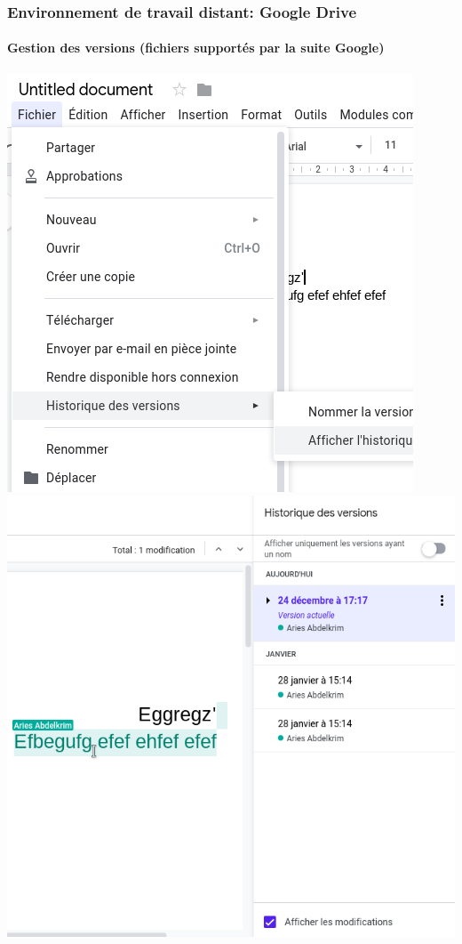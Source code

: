 \documentclass[xcolor=table]{beamer}
\begin{document}
\begin{frame}
\frametitle{Environnement de travail distant: Google Drive}
\framesubtitle{Gestion des versions (fichiers supportés par la suite Google)}

\begin{center}
	\includegraphics[width=
	.45\textwidth]{../img/Bweb01-environnement/drive-versionB1.png}
	\vline
	\includegraphics[width=
	.45\textwidth]{../img/Bweb01-environnement/drive-versionB2.png}
\end{center}

\end{frame}
\end{document}
